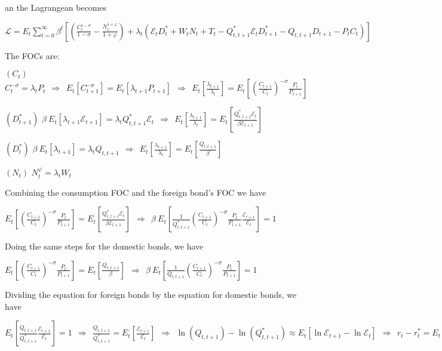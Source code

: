 \documentclass[
]{article}
\begin{document}
an the Lagrangean becomes

\(\mathcal{L} = \displaystyle E_t \sum_{t=0}^\infty \beta^t \left[ \left( \frac{C_t^{1-\sigma}}{1-\sigma}-\frac{N_t^{1+\varphi}}{1+\varphi} \right) + \lambda_t \left(\mathcal{E}_t D_t^* + W_tN_t + T_t - Q_{t,t+1}^*\mathcal{E}_t D_{t+1}^* - Q_{t,t+1}D_{t+1} - P_t C_t \right) \right]\)

The FOCs are:

\((C_t)\)
\(\displaystyle C_t^{-\sigma} = \lambda_tP_t \ \ \Rightarrow \ \ E_t[C_{t+1}^{-\sigma}] = E_t[\lambda_{t+1}P_{t+1}] \ \ \Rightarrow \ \ \displaystyle E_t\left[ \frac{\lambda_{t+1}}{\lambda_t}\right] = E_t\left[ \left( \frac{C_{t+1}}{C_t} \right)^{-\sigma}\frac{P_t}{P_{t+1}}\right]\)

\((D_{t+1}^*)\)
\(\beta \ E_t[\lambda_{t+1} \mathcal{E}_{t+1}] = \lambda_t Q_{t,t+1}^* \mathcal{E}_t \ \ \Rightarrow \ \ \displaystyle E_t\left[ \frac{\lambda_{t+1}}{\lambda_t}\right] = E_t\left[ \frac{Q_{t,t+1}^*\mathcal{E}_t}{\beta \mathcal{E}_{t+1}}\right]\)

\((D_{t}^*)\)
\(\beta \ E_t[\lambda_{t+1} ] = \lambda_t Q_{t,t+1}\ \ \Rightarrow \ \ \displaystyle E_t\left[ \frac{\lambda_{t+1}}{\lambda_t}\right] = E_t\left[ \frac{Q_{t,t+1}}{\beta }\right]\)

\((N_t)\) \(N_t^\varphi=\lambda_t W_t\)

Combining the consumption FOC and the foreign bond's FOC we have

\(\displaystyle E_t\left[ \left( \frac{C_{t+1}}{C_t} \right)^{-\sigma}\frac{P_t}{P_{t+1}}\right] = E_t\left[ \frac{Q_{t,t+1}^*\mathcal{E}_t}{\beta \mathcal{E}_{t+1}}\right] \ \ \Rightarrow \ \ \beta \  \displaystyle E_t\left[ \frac{1}{Q_{t,t+1}^*} \left( \frac{C_{t+1}}{C_t} \right)^{-\sigma}\frac{P_t}{P_{t+1}} \frac{\mathcal{E}_{t+1}}{\mathcal{E}_{t}} \right]=1\)

Doing the same steps for the domestic bonds, we have

\(\displaystyle E_t\left[ \left( \frac{C_{t+1}}{C_t} \right)^{-\sigma}\frac{P_t}{P_{t+1}}\right] = E_t\left[ \frac{Q_{t,t+1}}{\beta }\right] \ \ \Rightarrow \ \ \beta \  \displaystyle E_t\left[ \frac{1}{Q_{t,t+1}} \left( \frac{C_{t+1}}{C_t} \right)^{-\sigma}\frac{P_t}{P_{t+1}} \right]=1\)

Dividing the equation for foreign bonds by the equation for domestic
bonds, we have

\(\displaystyle E_t \left[ \frac{Q_{t,t+1}}{Q_{t,t+1}^*} \frac{\mathcal{E}_{t+1}}{\mathcal{E}_{t}} \right]=1 \ \ \Rightarrow \ \ \frac{Q_{t,t+1}}{Q_{t,t+1}^*} = E_t \left[ \frac{\mathcal{E}_{t+1}}{\mathcal{E}_{t}} \right] \ \ \Rightarrow \ \ \ln(Q_{t,t+1})-\ln(Q_{t,t+1}^*) \approx E_t[\ln{\mathcal{E}_{t+1} }-\ln \mathcal{E}_{t}] \ \ \Rightarrow \ \ r_t-r_t^*=E_t[\Delta e_{t+1}]\)
\end{document}
